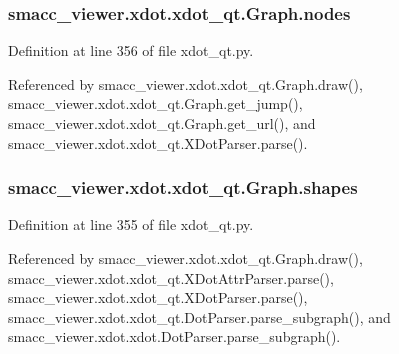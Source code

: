 \subsubsection[{\texorpdfstring{nodes}{nodes}}]{\setlength{\rightskip}{0pt plus 5cm}smacc\+\_\+viewer.\+xdot.\+xdot\+\_\+qt.\+Graph.\+nodes}\hypertarget{classsmacc__viewer_1_1xdot_1_1xdot__qt_1_1Graph_ac698552cd98ca56471f189938d2a7237}{}\label{classsmacc__viewer_1_1xdot_1_1xdot__qt_1_1Graph_ac698552cd98ca56471f189938d2a7237}


Definition at line 356 of file xdot\+\_\+qt.\+py.



Referenced by smacc\+\_\+viewer.\+xdot.\+xdot\+\_\+qt.\+Graph.\+draw(), smacc\+\_\+viewer.\+xdot.\+xdot\+\_\+qt.\+Graph.\+get\+\_\+jump(), smacc\+\_\+viewer.\+xdot.\+xdot\+\_\+qt.\+Graph.\+get\+\_\+url(), and smacc\+\_\+viewer.\+xdot.\+xdot\+\_\+qt.\+X\+Dot\+Parser.\+parse().

\subsubsection[{\texorpdfstring{shapes}{shapes}}]{\setlength{\rightskip}{0pt plus 5cm}smacc\+\_\+viewer.\+xdot.\+xdot\+\_\+qt.\+Graph.\+shapes}\hypertarget{classsmacc__viewer_1_1xdot_1_1xdot__qt_1_1Graph_ab492d3c89dcaa21da68d806f0a319500}{}\label{classsmacc__viewer_1_1xdot_1_1xdot__qt_1_1Graph_ab492d3c89dcaa21da68d806f0a319500}


Definition at line 355 of file xdot\+\_\+qt.\+py.



Referenced by smacc\+\_\+viewer.\+xdot.\+xdot\+\_\+qt.\+Graph.\+draw(), smacc\+\_\+viewer.\+xdot.\+xdot\+\_\+qt.\+X\+Dot\+Attr\+Parser.\+parse(), smacc\+\_\+viewer.\+xdot.\+xdot\+\_\+qt.\+X\+Dot\+Parser.\+parse(), smacc\+\_\+viewer.\+xdot.\+xdot\+\_\+qt.\+Dot\+Parser.\+parse\+\_\+subgraph(), and smacc\+\_\+viewer.\+xdot.\+xdot.\+Dot\+Parser.\+parse\+\_\+subgraph().

